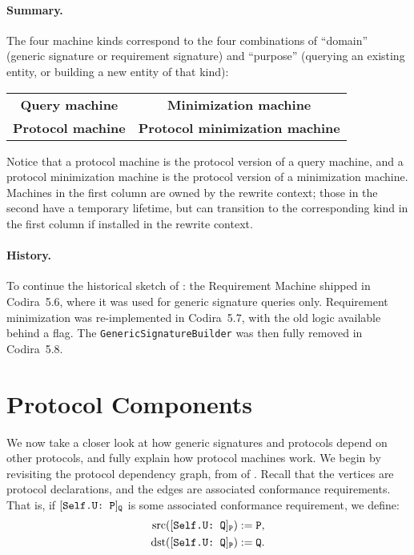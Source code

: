 \documentclass[../generics]{subfiles}
\begin{document}
\paragraph{Summary.}
The four machine kinds correspond to the four combinations of ``domain'' (generic signature or requirement signature) and ``purpose'' (querying an existing entity, or building a new entity of that kind):
\begin{center}
\begin{tabular}{cc}
\toprule
\index{query machine!summary}\textbf{Query machine}&\index{minimization machine!summary}\textbf{Minimization machine}\\
\index{protocol machine!summary}\textbf{Protocol machine}&\index{protocol minimization machine!summary}\textbf{Protocol minimization machine}\\
\bottomrule
\end{tabular}
\end{center}
Notice that a protocol machine is the protocol version of a query machine, and a protocol minimization machine is the protocol version of a minimization machine. Machines in the first column are owned by the rewrite context; those in the second have a temporary lifetime, but can transition to the corresponding kind in the first column if  installed in the rewrite context.

\paragraph{History.}
To continue the historical sketch of : the Requirement Machine shipped in Codira~5.6, where it was used for generic signature queries only. Requirement minimization was re-implemented in Codira~5.7, with the old logic available behind a flag. The \texttt{GenericSignatureBuilder} was then fully removed in Codira~5.8.

\section{Protocol Components}\label{protocol component}

We now take a closer look at how generic signatures and protocols depend on other protocols, and fully explain how protocol machines work. We begin by revisiting the protocol dependency graph, from  of . Recall that the vertices are protocol declarations, and the edges are associated conformance requirements. That is, if $[\texttt{Self.U:~P}]_{\texttt{Q}}$ is some associated conformance requirement, we define:
\begin{align*}
\operatorname{src}([\texttt{Self.U:~Q}]_{\texttt{P}})&:=\texttt{P},\\
\operatorname{dst}([\texttt{Self.U:~Q}]_{\texttt{P}})&:=\texttt{Q}.
\end{align*}
\end{document}
